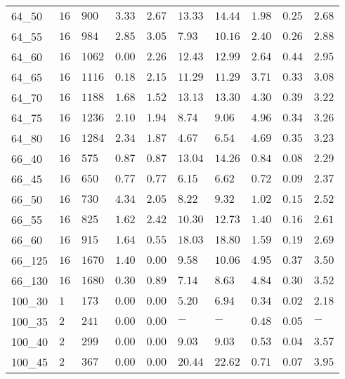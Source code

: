 \begin{center}
\begin{table}[]
\begin{tabular}{|lll|l|l|ll|lll|}
64\_50   & $16  $ & $900 $ & $3.33  $ & $2.67$ & $13.33$ & $14.44$ & $1.98  $ & $0.25    $ & $2.68     $ \\
64\_55   & $16  $ & $984 $ & $2.85  $ & $3.05$ & $7.93 $ & $10.16$ & $2.40  $ & $0.26    $ & $2.88     $ \\
64\_60   & $16  $ & $1062$ & $\bm{0.00}  $ & $2.26$ & $12.43$ & $12.99$ & $2.64  $ & $0.44    $ & $2.95     $ \\
64\_65   & $16  $ & $1116$ & $0.18  $ & $2.15$ & $11.29$ & $11.29$ & $3.71  $ & $0.33    $ & $3.08     $ \\
64\_70   & $16  $ & $1188$ & $1.68  $ & $1.52$ & $13.13$ & $13.30$ & $4.30  $ & $0.39    $ & $3.22     $ \\
64\_75   & $16  $ & $1236$ & $2.10  $ & $1.94$ & $8.74 $ & $9.06 $ & $4.96  $ & $0.34    $ & $3.26     $ \\
64\_80   & $16  $ & $1284$ & $2.34  $ & $1.87$ & $4.67 $ & $6.54 $ & $4.69  $ & $0.35    $ & $3.23     $ \\
\hline
66\_40   & $16  $ & $575 $ & $0.87  $ & $0.87$ & $13.04$ & $14.26$ & $0.84  $ & $0.08    $ & $2.29     $ \\
66\_45   & $16  $ & $650 $ & $0.77  $ & $0.77$ & $6.15 $ & $6.62 $ & $0.72  $ & $0.09    $ & $2.37     $ \\
66\_50   & $16  $ & $730 $ & $4.34  $ & $2.05$ & $8.22 $ & $9.32 $ & $1.02  $ & $0.15    $ & $2.52     $ \\
66\_55   & $16  $ & $825 $ & $1.62  $ & $2.42$ & $10.30$ & $12.73$ & $1.40  $ & $0.16    $ & $2.61     $ \\
66\_60   & $16  $ & $915 $ & $1.64  $ & $0.55$ & $18.03$ & $18.80$ & $1.59  $ & $0.19    $ & $2.69     $ \\
66\_125  & $16  $ & $1670$ & $1.40  $ & $\bm{0.00}$ & $9.58 $ & $10.06$ & $4.95  $ & $0.37    $ & $3.50     $ \\
66\_130  & $16  $ & $1680$ & $0.30  $ & $0.89$ & $7.14 $ & $8.63 $ & $4.84  $ & $0.30    $ & $3.52     $ \\
\hline
100\_30  & $1   $ & $173 $ & $\bm{0.00}  $ & $\bm{0.00}$ & $5.20 $ & $6.94 $ & $0.34  $ & $0.02    $ & $2.18     $ \\
100\_35  & $2   $ & $241 $ & $\bm{0.00}  $ & $\bm{0.00}$ & $-    $ & $-    $ & $0.48  $ & $0.05    $ & $-        $ \\
100\_40  & $2   $ & $299 $ & $\bm{0.00}  $ & $\bm{0.00}$ & $9.03 $ & $9.03 $ & $0.53  $ & $0.04    $ & $3.57     $ \\
100\_45  & $2   $ & $367 $ & $\bm{0.00}  $ & $\bm{0.00}$ & $20.44$ & $22.62$ & $0.71  $ & $0.07    $ & $3.95     $ \\

\end{tabular}
\end{table}
\end{center}
